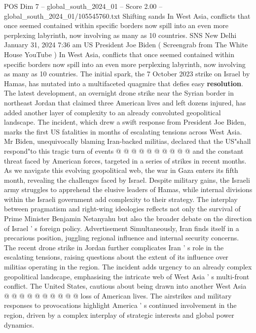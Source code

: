 \begin{textsample}{POS Dim 7 – global\_south\_2024\_01 – Score 2.00 – global\_south\_2024\_01/105545760.txt}  \label{ex:f7_pos_049}
Shifting sands In West Asia, conflicts that once seemed contained within specific borders now spill into an even more perplexing labyrinth, now involving as many as 10 countries.
SNS New Delhi January 31, 2024 7:36 am US President Joe Biden ( Screengrab from The White House YouTube ) In West Asia, conflicts that once seemed contained within specific borders now spill into an even more perplexing labyrinth, now involving as many as 10 countries.
The initial spark, the 7 October 2023 strike on Israel by Hamas, has mutated into a multifaceted quagmire that defies easy \textbf{resolution}.
The latest development, an overnight drone strike near the Syrian border in northeast Jordan that claimed three American lives and left dozens injured, has added another layer of complexity to an already convoluted geopolitical landscape.
The incident, which drew a swift response from President Joe Biden, marks the first US fatalities in months of escalating tensions across West Asia.
Mr Biden, unequivocally blaming Iran-backed militias, declared that the US"shall respond"to this tragic turn of events @ @ @ @ @ @ @ @ @ @ and the constant threat faced by American forces, targeted in a series of strikes in recent months.
As we navigate this evolving geopolitical web, the war in Gaza enters its fifth month, revealing the challenges faced by Israel.
Despite military gains, the Israeli army struggles to apprehend the elusive leaders of Hamas, while internal divisions within the Israeli government add complexity to their strategy.
The interplay between pragmatism and right-wing ideologies reflects not only the survival of Prime Minister Benjamin Netanyahu but also the broader debate on the direction of Israel ' s foreign policy.
Advertisement Simultaneously, Iran finds itself in a precarious position, juggling regional influence and internal security concerns.
The recent drone strike in Jordan further complicates Iran ' s role in the escalating tensions, raising questions about the extent of its influence over militias operating in the region.
The incident adds urgency to an already complex geopolitical landscape, emphasising the intricate web of West Asia ' s multi-front conflict.
The United States, cautious about being drawn into another West Asia @ @ @ @ @ @ @ @ @ @ loss of American lives.
The airstrikes and military responses to provocations highlight America ' s continued involvement in the region, driven by a complex interplay of strategic interests and global power dynamics.

\end{textsample}
